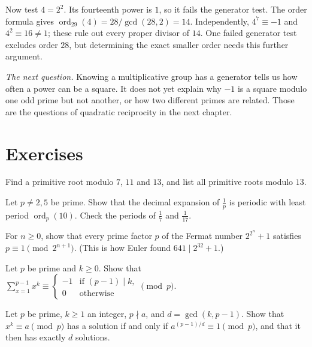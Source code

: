 Now test $4=2^2$. Its fourteenth power is $1$, so it fails
the generator test. The order formula gives
$\operatorname{ord}_{29}(4)=28/\gcd(28,2)=14$.
Independently, $4^7\equiv-1$ and $4^2\equiv16\ne1$;
these rule out every proper divisor of $14$. One failed
generator test excludes order $28$, but determining the
exact smaller order needs this further argument.


\medskip
\noindent\emph{The next question.} Knowing a multiplicative group has a generator tells us how often a power can be a square. It does not yet explain why $-1$ is a square modulo one odd prime but not another, or how two different primes are related. Those are the questions of quadratic reciprocity in the next chapter.

\section{Exercises}

\begin{exercise}[$\star$]\label{ex:findroots}
Find a primitive root modulo $7$, $11$ and $13$, and list all primitive roots modulo $13$.
\end{exercise}

\begin{exercise}[$\star$]\label{ex:period}
Let $p\ne2,5$ be prime. Show that the decimal expansion of $\frac1p$ is periodic with least period $\operatorname{ord}_p(10)$. Check the periods of $\frac17$ and $\frac1{17}$.
\end{exercise}

\begin{exercise}[$\star\star$]\label{ex:fermatfactor}
For $n\ge0$, show that every prime factor $p$ of the Fermat number $2^{2^n}+1$ satisfies $p\equiv1\pmod{2^{n+1}}$. (This is how Euler found $641\mid2^{32}+1$.)
\end{exercise}

\begin{exercise}[$\star\star$]\label{ex:powersum}
Let $p$ be prime and $k\ge0$. Show that $\displaystyle\sum_{x=1}^{p-1}x^k\equiv\begin{cases}-1&\text{if }(p-1)\mid k,\\0&\text{otherwise}\end{cases}\pmod p$.
\end{exercise}

\begin{exercise}[$\star\star$]\label{ex:kth}
Let $p$ be prime, $k\ge1$ an integer, $p\nmid a$, and $d=\gcd(k,p-1)$. Show that $x^k\equiv a\pmod p$ has a solution if and only if $a^{(p-1)/d}\equiv1\pmod p$, and that it then has exactly $d$ solutions.
\end{exercise}

